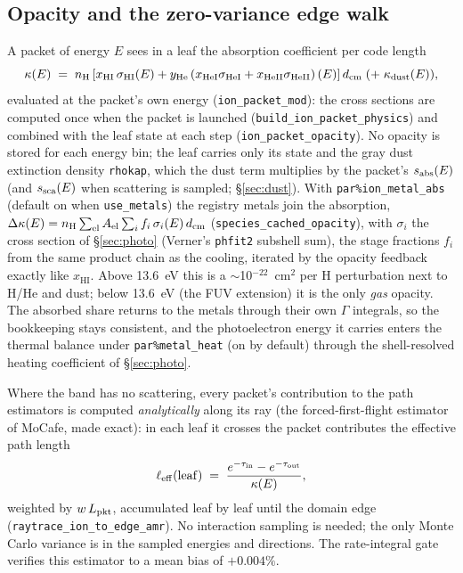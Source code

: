 \documentclass[english,a4paper]{my_memo}
\newcommand{\code}[1]{\texttt{#1}}
\newcommand{\xHI}{x_{\mathrm{HI}}}
\begin{document}
\subsection{Opacity and the zero-variance edge walk}
A packet of energy $E$ sees in a leaf the absorption coefficient per code
length
\begin{equation}
  \kappa(E) \;=\; n_{\rm H}\left[ \xHI\,\sigma_{\rm HI}(E)
   + y_{\rm He}\left( x_{\rm HeI}\sigma_{\rm HeI} +
     x_{\rm HeII}\sigma_{\rm HeII}\right)(E)\right] d_{\rm cm}
   \;(+\;\kappa_{\rm dust}(E)),
  \label{eq:packet-opacity}
\end{equation}
evaluated at the packet's own energy (\code{ion\_packet\_mod}): the cross
sections are computed once when the packet is launched
(\code{build\_ion\_packet\_physics}) and combined with the leaf state at each
step (\code{ion\_packet\_opacity}).  No opacity is stored for each energy
bin; the leaf carries only its state and the gray dust extinction density
\code{rhokap}, which the dust term multiplies by the packet's
$s_{\rm abs}(E)$ (and $s_{\rm sca}(E)$ when scattering is sampled;
\S\ref{sec:dust}).
With \code{par\%ion\_metal\_abs} (default on when \code{use\_metals})
the registry metals join the absorption,
$\Delta\kappa(E) = n_{\rm H}\sum_{\rm el} A_{\rm el} \sum_i
f_i\,\sigma_i(E)\,d_{\rm cm}$ (\code{species\_cached\_opacity}), with
$\sigma_i$ the cross section of
\S\ref{sec:photo} (Verner's \code{phfit2} subshell sum), the stage fractions $f_i$ from the same product chain as the
cooling, iterated by the opacity feedback exactly like $\xHI$.  Above
13.6~eV this is a $\sim$10$^{-22}$~cm$^2$ per H perturbation next to H/He
and dust; below 13.6~eV (the FUV extension) it is the only \emph{gas}
opacity.  The absorbed
share returns to the metals through their own $\Gamma$ integrals, so the
bookkeeping stays consistent, and the photoelectron energy it carries
enters the thermal balance under \code{par\%metal\_heat} (on by default)
through the shell-resolved heating coefficient of \S\ref{sec:photo}.

Where the band has no scattering, every packet's contribution to the
path estimators is computed \emph{analytically} along its ray (the
forced-first-flight estimator of MoCafe, made exact): in each leaf it
crosses the packet contributes the effective path length
\begin{equation}
  \ell_{\rm eff}({\rm leaf}) \;=\;
  \frac{e^{-\tau_{\rm in}} - e^{-\tau_{\rm out}}}{\kappa(E)},
  \label{eq:edgewalk}
\end{equation}
weighted by $w\,L_{\rm pkt}$, accumulated leaf by leaf until the domain
edge (\code{raytrace\_ion\_to\_edge\_amr}).  No interaction sampling is
needed; the only Monte Carlo variance is in the sampled energies and
directions.  The rate-integral gate verifies this estimator to a mean bias
of $+0.004\%$.
\end{document}
